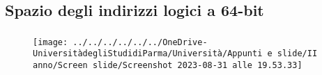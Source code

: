 \documentclass{beamer}
\newenvironment{mainframe}{
	\begin{frame}
		\frametitle{\insertsubsection}
		\framesubtitle{\insertsection}
	}{
	\end{frame}
}
\begin{document}
\subsection{Spazio degli indirizzi logici a 64-bit}
\begin{mainframe}
	\begin{figure}
		\centering
		\texttt{[image: ../../../../../../OneDrive-UniversitàdegliStudidiParma/Università/Appunti e slide/II anno/Screen slide/Screenshot 2023-08-31 alle 19.53.33]}
	\end{figure}
\end{mainframe}
\end{document}
